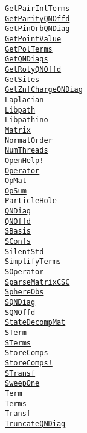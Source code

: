 \documentclass{timesjhep}
\begin{document}
\begin{multicols}{3}
    \href{}{\lstinline|GetPairIntTerms|}\\
    \href{}{\lstinline|GetParityQNOffd|}\\
    \href{}{\lstinline|GetPinOrbQNDiag|}\\
    \href{}{\lstinline|GetPointValue|}\\
    \href{}{\lstinline|GetPolTerms|}\\
    \href{}{\lstinline|GetQNDiags|}\\
    \href{}{\lstinline|GetRotyQNOffd|}\\
    \href{}{\lstinline|GetSites|}\\
    \href{}{\lstinline|GetZnfChargeQNDiag|}\\
    \href{}{\lstinline|Laplacian|}\\
    \href{}{\lstinline|Libpath|}\\
    \href{}{\lstinline|Libpathino|}\\
    \href{}{\lstinline|Matrix|}\\
    \href{}{\lstinline|NormalOrder|}\\
    \href{}{\lstinline|NumThreads|}\\
    \href{}{\lstinline|OpenHelp!|}\\
    \href{}{\lstinline|Operator|}\\
    \href{}{\lstinline|OpMat|}\\
    \href{}{\lstinline|OpSum|}\\
    \href{}{\lstinline|ParticleHole|}\\
    \href{}{\lstinline|QNDiag|}\\
    \href{}{\lstinline|QNOffd|}\\
    \href{}{\lstinline|SBasis|}\\
    \href{}{\lstinline|SConfs|}\\
    \href{}{\lstinline|SilentStd|}\\
    \href{}{\lstinline|SimplifyTerms|}\\
    \href{}{\lstinline|SOperator|}\\
    \href{}{\lstinline|SparseMatrixCSC|}\\
    \href{}{\lstinline|SphereObs|}\\
    \href{}{\lstinline|SQNDiag|}\\
    \href{}{\lstinline|SQNOffd|}\\
    \href{}{\lstinline|StateDecompMat|}\\
    \href{}{\lstinline|STerm|}\\
    \href{}{\lstinline|STerms|}\\
    \href{}{\lstinline|StoreComps|}\\
    \href{}{\lstinline|StoreComps!|}\\
    \href{}{\lstinline|STransf|}\\
    \href{}{\lstinline|SweepOne|}\\
    \href{}{\lstinline|Term|}\\
    \href{}{\lstinline|Terms|}\\
    \href{}{\lstinline|Transf|}\\
    \href{}{\lstinline|TruncateQNDiag|}\\

\end{multicols}
\end{document}
